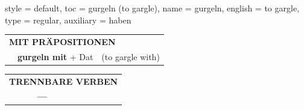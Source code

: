 \begin{verbentry}{
  style = {default},
  toc = {gurgeln (to gargle)},
  name = {gurgeln},
  english = {to gargle},
  type = {regular},
  auxiliary = {haben}
}
\vspace{10pt}

\begin{tabular}{lll}
\multicolumn{3}{l}{\textbf{MIT PRÄPOSITIONEN}}\\
& \textbf{gurgeln mit} + Dat & (to gargle with)\\
\end{tabular}
\hfill
\begin{tabular}{lll}
\multicolumn{3}{l}{\textbf{TRENNBARE VERBEN}}\\
& \textbf{---} & \\
\end{tabular}
\vspace{-5pt}
\end{verbentry}
